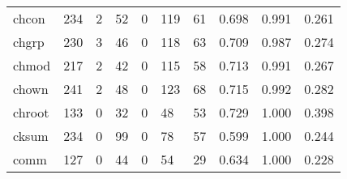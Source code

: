 \begin{longtable}{lp{2.0cm}p{2.0cm}p{2.0cm}p{2.0cm}p{2.0cm}p{2.0cm}p{2.0cm}p{2.0cm}p{2.0cm}}
chcon     &                    234 &                                  2 &                                52 &                                0 &                               119 &                              61 &                                0.698 &                                  0.991 &                                0.261 \\
chgrp     &                    230 &                                  3 &                                46 &                                0 &                               118 &                              63 &                                0.709 &                                  0.987 &                                0.274 \\
chmod     &                    217 &                                  2 &                                42 &                                0 &                               115 &                              58 &                                0.713 &                                  0.991 &                                0.267 \\
chown     &                    241 &                                  2 &                                48 &                                0 &                               123 &                              68 &                                0.715 &                                  0.992 &                                0.282 \\
chroot    &                    133 &                                  0 &                                32 &                                0 &                                48 &                              53 &                                0.729 &                                  1.000 &                                0.398 \\
cksum     &                    234 &                                  0 &                                99 &                                0 &                                78 &                              57 &                                0.599 &                                  1.000 &                                0.244 \\
comm      &                    127 &                                  0 &                                44 &                                0 &                                54 &                              29 &                                0.634 &                                  1.000 &                                0.228 \\

\end{longtable}
